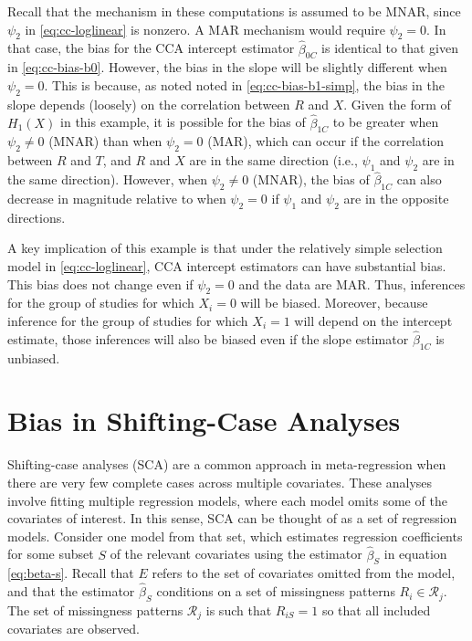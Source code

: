\documentclass[
]{article}
\begin{document}
Recall that the mechanism in these computations is assumed to be MNAR, since \(\psi_2\) in \eqref{eq:cc-loglinear} is nonzero.
A MAR mechanism would require \(\psi_2 = 0\).
In that case, the bias for the CCA intercept estimator \(\hat{\beta}_{0C}\) is identical to that given in \eqref{eq:cc-bias-b0}.
However, the bias in the slope will be slightly different when \(\psi_2 = 0\).
This is because, as noted noted in \eqref{eq:cc-bias-b1-simp}, the bias in the slope depends (loosely) on the correlation between \(R\) and \(X\).
Given the form of \(H_1(X)\) in this example, it is possible for the bias of \(\hat{\beta}_{1C}\) to be greater when \(\psi_2 \neq 0\) (MNAR) than when \(\psi_2 = 0\) (MAR), which can occur if the correlation between \(R\) and \(T\), and \(R\) and \(X\) are in the same direction (i.e., \(\psi_1\) and \(\psi_2\) are in the same direction).
However, when \(\psi_2 \neq 0\) (MNAR), the bias of \(\hat{\beta}_{1C}\) can also decrease in magnitude relative to when \(\psi_2 = 0\) if \(\psi_1\) and \(\psi_2\) are in the opposite directions.

A key implication of this example is that under the relatively simple selection model in \eqref{eq:cc-loglinear}, CCA intercept estimators can have substantial bias.
This bias does not change even if \(\psi_2 = 0\) and the data are MAR.
Thus, inferences for the group of studies for which \(X_i = 0\) will be biased.
Moreover, because inference for the group of studies for which \(X_i = 1\) will depend on the intercept estimate, those inferences will also be biased even if the slope estimator \(\hat{\beta}_{1C}\) is unbiased.

\hypertarget{bias-in-shifting-case-analyses}{%
\section{Bias in Shifting-Case Analyses}\label{bias-in-shifting-case-analyses}}

Shifting-case analyses (SCA) are a common approach in meta-regression when there are very few complete cases across multiple covariates.
These analyses involve fitting multiple regression models, where each model omits some of the covariates of interest.
In this sense, SCA can be thought of as a set of regression models.
Consider one model from that set, which estimates regression coefficients for some subset \(S\) of the relevant covariates using the estimator \(\hat{\beta}_S\) in equation \eqref{eq:beta-s}.
Recall that \(E\) refers to the set of covariates omitted from the model, and that the estimator \(\hat{\beta}_S\) conditions on a set of missingness patterns \(R_i \in \mathcal{R}_j\).
The set of missingness patterns \(\mathcal{R}_j\) is such that \(R_{iS} = 1\) so that all included covariates are observed.
\end{document}
